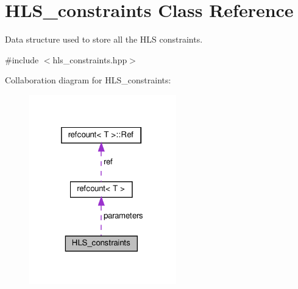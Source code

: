 \hypertarget{classHLS__constraints}{}\section{H\+L\+S\+\_\+constraints Class Reference}
\label{classHLS__constraints}


Data structure used to store all the H\+LS constraints.  




{\ttfamily \#include $<$hls\+\_\+constraints.\+hpp$>$}



Collaboration diagram for H\+L\+S\+\_\+constraints\+:
\nopagebreak
\begin{figure}[H]
\begin{center}
\leavevmode
\includegraphics[width=181pt]{d3/dbb/classHLS__constraints__coll__graph}
\end{center}
\end{figure}
